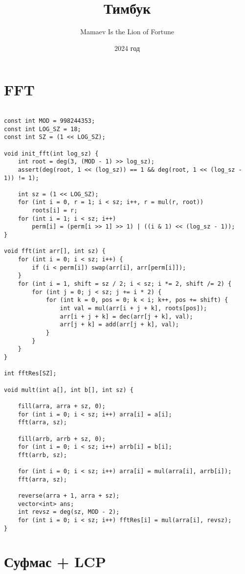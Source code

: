 \documentclass{article}
\title{Тимбук}
\author{Mamaev Is the Lion of Fortune}
\date{2024 год}
\begin{document}
    
    \maketitle
    
    \section{FFT}

    \begin{verbatim}

const int MOD = 998244353;
const int LOG_SZ = 18;
const int SZ = (1 << LOG_SZ);

void init_fft(int log_sz) {
    int root = deg(3, (MOD - 1) >> log_sz);
    assert(deg(root, 1 << (log_sz)) == 1 && deg(root, 1 << (log_sz - 1)) != 1);
    
    int sz = (1 << LOG_SZ);
    for (int i = 0, r = 1; i < sz; i++, r = mul(r, root))
        roots[i] = r;
    for (int i = 1; i < sz; i++)
        perm[i] = (perm[i >> 1] >> 1) | ((i & 1) << (log_sz - 1));
}

void fft(int arr[], int sz) {
    for (int i = 0; i < sz; i++) {
        if (i < perm[i]) swap(arr[i], arr[perm[i]]);
    }
    for (int i = 1, shift = sz / 2; i < sz; i *= 2, shift /= 2) {
        for (int j = 0; j < sz; j += i * 2) {
            for (int k = 0, pos = 0; k < i; k++, pos += shift) {
                int val = mul(arr[i + j + k], roots[pos]);
                arr[i + j + k] = dec(arr[j + k], val);
                arr[j + k] = add(arr[j + k], val);
            }
        }
    }
}

int fftRes[SZ];

void mult(int a[], int b[], int sz) {

    fill(arra, arra + sz, 0);
    for (int i = 0; i < sz; i++) arra[i] = a[i];
    fft(arra, sz);

    fill(arrb, arrb + sz, 0);
    for (int i = 0; i < sz; i++) arrb[i] = b[i];
    fft(arrb, sz);

    for (int i = 0; i < sz; i++) arra[i] = mul(arra[i], arrb[i]);
    fft(arra, sz);

    reverse(arra + 1, arra + sz);
    vector<int> ans;
    int revsz = deg(sz, MOD - 2);
    for (int i = 0; i < sz; i++) fftRes[i] = mul(arra[i], revsz);
}
    \end{verbatim}

    \section{Суфмас + LCP}
\end{document}
